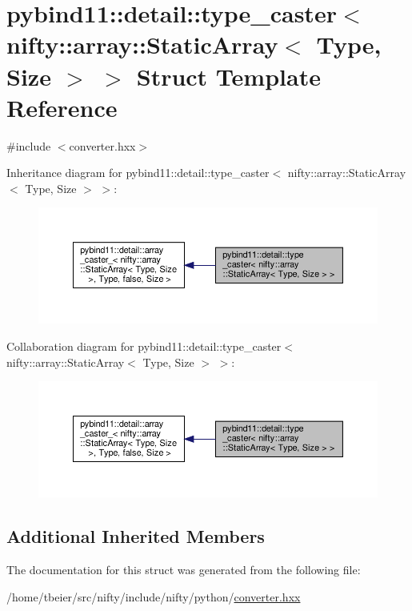 \hypertarget{structpybind11_1_1detail_1_1type__caster_3_01nifty_1_1array_1_1StaticArray_3_01Type_00_01Size_01_4_01_4}{}\section{pybind11\+:\+:detail\+:\+:type\+\_\+caster$<$ nifty\+:\+:array\+:\+:Static\+Array$<$ Type, Size $>$ $>$ Struct Template Reference}
\label{structpybind11_1_1detail_1_1type__caster_3_01nifty_1_1array_1_1StaticArray_3_01Type_00_01Size_01_4_01_4}


{\ttfamily \#include $<$converter.\+hxx$>$}



Inheritance diagram for pybind11\+:\+:detail\+:\+:type\+\_\+caster$<$ nifty\+:\+:array\+:\+:Static\+Array$<$ Type, Size $>$ $>$\+:
\nopagebreak
\begin{figure}[H]
\begin{center}
\leavevmode
\includegraphics[width=350pt]{structpybind11_1_1detail_1_1type__caster_3_01nifty_1_1array_1_1StaticArray_3_01Type_00_01Size_01_4_01_4__inherit__graph}
\end{center}
\end{figure}


Collaboration diagram for pybind11\+:\+:detail\+:\+:type\+\_\+caster$<$ nifty\+:\+:array\+:\+:Static\+Array$<$ Type, Size $>$ $>$\+:
\nopagebreak
\begin{figure}[H]
\begin{center}
\leavevmode
\includegraphics[width=350pt]{structpybind11_1_1detail_1_1type__caster_3_01nifty_1_1array_1_1StaticArray_3_01Type_00_01Size_01_4_01_4__coll__graph}
\end{center}
\end{figure}
\subsection*{Additional Inherited Members}


The documentation for this struct was generated from the following file\+:\begin{DoxyCompactItemize}
\item 
/home/tbeier/src/nifty/include/nifty/python/\hyperlink{converter_8hxx}{converter.\+hxx}\end{DoxyCompactItemize}
